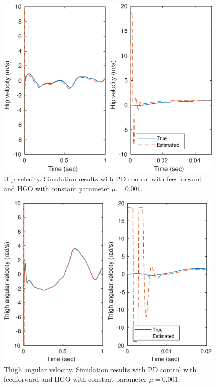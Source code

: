 \documentclass[letterpaper, 10 pt, conference]{ieeeconf}  %
\theoremstyle{plain}
\theoremstyle{definition}
\theoremstyle{remark}
\begin{document}
%
\begin{figure}[h!]
\begin{center}
\includegraphics[width = 13cm]{Figs/dq_hip_mu_1e-03.eps}
\caption{Hip velocity. Simulation results with PD control with feedforward and HGO with constant parameter $\mu=0.001$.}
\label{fig:dhip}
\end{center}
\end{figure}
%
%
\begin{figure}[h!]
\begin{center}
\includegraphics[width = 13cm]{Figs/dq_thigh_mu_1e-03.eps}
\caption{Thigh angular velocity. Simulation results with PD control with feedforward and HGO with constant parameter $\mu=0.001$.}
\label{fig:dthigh}
\end{center}
\end{figure}
\end{document}
